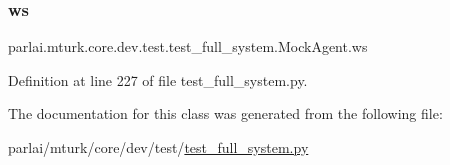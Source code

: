 \subsubsection{\texorpdfstring{ws}{ws}}
{\footnotesize\ttfamily parlai.\+mturk.\+core.\+dev.\+test.\+test\+\_\+full\+\_\+system.\+Mock\+Agent.\+ws}



Definition at line 227 of file test\+\_\+full\+\_\+system.\+py.



The documentation for this class was generated from the following file\+:\begin{DoxyCompactItemize}
\item 
parlai/mturk/core/dev/test/\hyperlink{dev_2test_2test__full__system_8py}{test\+\_\+full\+\_\+system.\+py}\end{DoxyCompactItemize}
